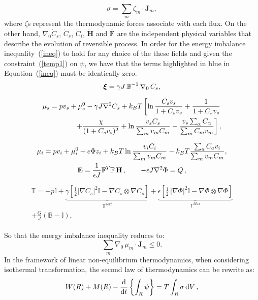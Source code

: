 \begin{equation}
\sigma = \sum_m \zeta_m \cdot \mathbf{J}_m,
\label{dis}
\end{equation}
where $\zeta$s represent the thermodynamic forces associate with each flux. On the other hand, $\nabla_0 \dot{C}_s$, $\dot{C}_s$, $\dot{C}_i$, $\mathbf{\dot{H}}$ and $\dot{\mathbb{F}}$ are the independent physical variables that describe the evolution of reversible process. In order for the energy imbalance inequality~(\ref{ineq}) to hold for any choice of the these fields and given the constraint~(\ref{temp1}) on $\psi$, we have that the terms highlighted in blue in Equation~(\ref{ineq}) must be identically zero. 
\begin{gather}
\boldsymbol{\xi} = \gamma J \,\mathbb{B}^{-1} \,\nabla_0 \,C_s,\label{sys1}\\[2mm]
\begin{aligned}
\mu_s = p v_s + \mu_s^0 - \gamma J \nabla^2 C_s + k_BT\left[\ln \frac{C_s v_s}{1+C_s v_s} + \frac{1}{1+C_sv_s}\right.\\
\left.\ \ \ \ \ \ +\frac{\chi}{(1+C_s v_s)^2} + \ln \frac{v_s C_s}{\sum_m v_mC_m} - \frac{v_s \sum_\alpha C_\alpha}{\sum_m C_m v_m} \right], 
\end{aligned}\label{gov1}\\[2.5mm]
\mu_i = p v_i + \mu^0_i + e\Phi z_i + k_BT \ln \frac{v_iC_i}{\sum_m v_m C_m} - k_BT \frac{\sum_a C_a v_i}{\sum_m v_m C_m},\label{mu}\\
\mathbf{E} = \frac{1}{\epsilon J} \mathbb{F}^T \mathbb{F}\, \mathbf{H}\, , \qquad -\epsilon J \nabla^2 \Phi = Q\, ,\label{sys2}
\end{gather}
\begin{gather}
\begin{aligned}
\mathbb{T}= -p \mathbb{I} + \underbrace{\gamma \left[\frac{1}{2} |\nabla C_s|^2\mathbb{I} - \nabla C_s \otimes \nabla C_s\right]}_{\mathbb{T}^{kort}}+ \underbrace{\epsilon \left[\frac{1}{2} \,|\nabla \Phi|^2\mathbb{I} -\nabla \Phi \otimes \nabla \Phi\right]}_{\mathbb{T}^{Max}}\\
+ \frac{G}{J}\left(\mathbb{B}-\mathbb{I}\right),
\end{aligned}
\label{sys3}
\end{gather}

So that the energy imbalance inequality reduces to:
\begin{equation}
\sum_m \nabla_0 \,\mu_m \cdot \mathbf{J}_m \leq 0.
\end{equation}
In the framework of linear non-equilibrium thermodynamics, when considering isothermal transformation, the second law of thermodynamics can be rewrite as:
\begin{equation}
W(R)+M(R)-\frac{\text{d}}{\text{d} t} \left\{\int_R \psi \right\} = T \int_R \sigma \,\text{d} V\, ,
\label{eqCIT}
\end{equation}

